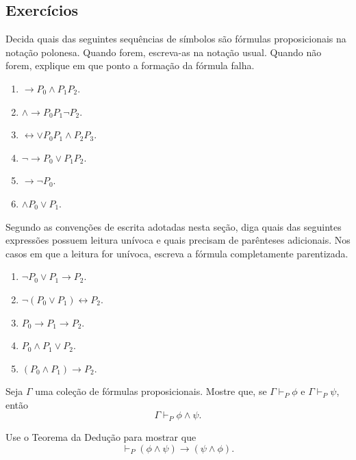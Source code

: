 \subsection*{Exercícios}

\begin{exercise}
    Decida quais das seguintes sequências de símbolos são fórmulas proposicionais na notação polonesa.
    Quando forem, escreva-as na notação usual.
    Quando não forem, explique em que ponto a formação da fórmula falha.
    \begin{enumerate}[label=(\alph*)]
        \item $\rightarrow P_0 \wedge P_1 P_2$.
        \item $\wedge \rightarrow P_0 P_1 \neg P_2$.
        \item $\leftrightarrow \vee P_0 P_1 \wedge P_2 P_3$.
        \item $\neg \rightarrow P_0 \vee P_1 P_2$.
        \item $\rightarrow \neg P_0$.
        \item $\wedge P_0 \vee P_1$.
    \end{enumerate}
\end{exercise}

\begin{exercise}
    Segundo as convenções de escrita adotadas nesta seção, diga quais das seguintes expressões possuem leitura unívoca e quais precisam de parênteses adicionais.
    Nos casos em que a leitura for unívoca, escreva a fórmula completamente parentizada.
    \begin{enumerate}[label=(\alph*)]
        \item $\neg P_0\vee P_1\rightarrow P_2$.
        \item $\neg(P_0\vee P_1)\leftrightarrow P_2$.
        \item $P_0\rightarrow P_1\rightarrow P_2$.
        \item $P_0\wedge P_1\vee P_2$.
        \item $(P_0\wedge P_1)\rightarrow P_2$.
    \end{enumerate}
\end{exercise}

\begin{exercise}
    Seja $\Gamma$ uma coleção de fórmulas proposicionais.
    Mostre que, se $\Gamma\vdash_P \phi$ e $\Gamma\vdash_P \psi$, então
    \[
        \Gamma\vdash_P \phi\land\psi.
    \]
\end{exercise}

\begin{exercise}
    Use o Teorema da Dedução para mostrar que
    \[
        \vdash_P (\phi\land\psi)\rightarrow(\psi\land\phi).
    \]
\end{exercise}

